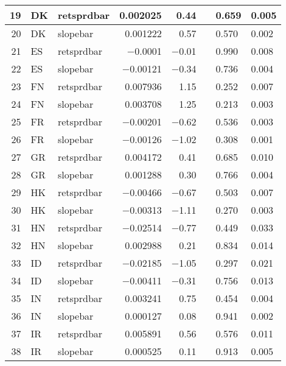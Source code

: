 \begin{longtable}{|r|l|l|r|r|l|l|l|}
   19 &    DK &    retsprdbar &    0.002025 &    0.44 &      &    0.659 &    0.005\\\hline
   20 &    DK &    slopebar &    0.001222 &    0.57 &      &    0.570 &    0.002\\\hline
   21 &    ES &    retsprdbar &    $-$0.0001 &    $-$0.01 &      &    0.990 &    0.008\\\hline
   22 &    ES &    slopebar &    $-$0.00121 &    $-$0.34 &      &    0.736 &    0.004\\\hline
   23 &    FN &    retsprdbar &    0.007936 &    1.15 &      &    0.252 &    0.007\\\hline
   24 &    FN &    slopebar &    0.003708 &    1.25 &      &    0.213 &    0.003\\\hline
   25 &    FR &    retsprdbar &    $-$0.00201 &    $-$0.62 &      &    0.536 &    0.003\\\hline
   26 &    FR &    slopebar &    $-$0.00126 &    $-$1.02 &      &    0.308 &    0.001\\\hline
   27 &    GR &    retsprdbar &    0.004172 &    0.41 &      &    0.685 &    0.010\\\hline
   28 &    GR &    slopebar &    0.001288 &    0.30 &      &    0.766 &    0.004\\\hline
   29 &    HK &    retsprdbar &    $-$0.00466 &    $-$0.67 &      &    0.503 &    0.007\\\hline
   30 &    HK &    slopebar &    $-$0.00313 &    $-$1.11 &      &    0.270 &    0.003\\\hline
   31 &    HN &    retsprdbar &    $-$0.02514 &    $-$0.77 &      &    0.449 &    0.033\\\hline
   32 &    HN &    slopebar &    0.002988 &    0.21 &      &    0.834 &    0.014\\\hline
   33 &    ID &    retsprdbar &    $-$0.02185 &    $-$1.05 &      &    0.297 &    0.021\\\hline
   34 &    ID &    slopebar &    $-$0.00411 &    $-$0.31 &      &    0.756 &    0.013\\\hline
   35 &    IN &    retsprdbar &    0.003241 &    0.75 &      &    0.454 &    0.004\\\hline
   36 &    IN &    slopebar &    0.000127 &    0.08 &      &    0.941 &    0.002\\\hline
   37 &    IR &    retsprdbar &    0.005891 &    0.56 &      &    0.576 &    0.011\\\hline
   38 &    IR &    slopebar &    0.000525 &    0.11 &      &    0.913 &    0.005\\\hline

\end{longtable}
